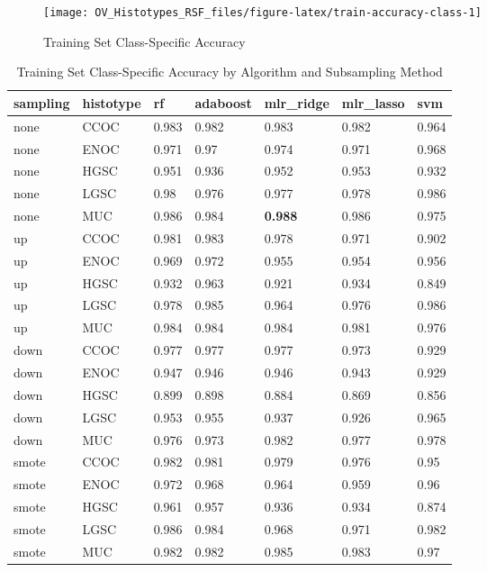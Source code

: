 \documentclass[
]{report}
\begin{document}
\begin{figure}[H]

{\centering \texttt{[image: OV\_Histotypes\_RSF\_files/figure-latex/train-accuracy-class-1]} 

}

\caption{Training Set Class-Specific Accuracy}\label{fig:train-accuracy-class}
\end{figure}

\begin{table}

\caption{\label{tab:train-accuracy-class-table}Training Set Class-Specific Accuracy by Algorithm and Subsampling Method}
\centering
\begin{tabular}[t]{l|l|l|l|l|l|l}
\hline
sampling & histotype & rf & adaboost & mlr\_ridge & mlr\_lasso & svm\\
\hline
none & CCOC & 0.983 & 0.982 & 0.983 & 0.982 & 0.964\\
\hline
none & ENOC & 0.971 & 0.97 & 0.974 & 0.971 & 0.968\\
\hline
none & HGSC & 0.951 & 0.936 & 0.952 & 0.953 & 0.932\\
\hline
none & LGSC & 0.98 & 0.976 & 0.977 & 0.978 & 0.986\\
\hline
none & MUC & 0.986 & 0.984 & \textbf{0.988} & 0.986 & 0.975\\
\hline
up & CCOC & 0.981 & 0.983 & 0.978 & 0.971 & 0.902\\
\hline
up & ENOC & 0.969 & 0.972 & 0.955 & 0.954 & 0.956\\
\hline
up & HGSC & 0.932 & 0.963 & 0.921 & 0.934 & 0.849\\
\hline
up & LGSC & 0.978 & 0.985 & 0.964 & 0.976 & 0.986\\
\hline
up & MUC & 0.984 & 0.984 & 0.984 & 0.981 & 0.976\\
\hline
down & CCOC & 0.977 & 0.977 & 0.977 & 0.973 & 0.929\\
\hline
down & ENOC & 0.947 & 0.946 & 0.946 & 0.943 & 0.929\\
\hline
down & HGSC & 0.899 & 0.898 & 0.884 & 0.869 & 0.856\\
\hline
down & LGSC & 0.953 & 0.955 & 0.937 & 0.926 & 0.965\\
\hline
down & MUC & 0.976 & 0.973 & 0.982 & 0.977 & 0.978\\
\hline
smote & CCOC & 0.982 & 0.981 & 0.979 & 0.976 & 0.95\\
\hline
smote & ENOC & 0.972 & 0.968 & 0.964 & 0.959 & 0.96\\
\hline
smote & HGSC & 0.961 & 0.957 & 0.936 & 0.934 & 0.874\\
\hline
smote & LGSC & 0.986 & 0.984 & 0.968 & 0.971 & 0.982\\
\hline
smote & MUC & 0.982 & 0.982 & 0.985 & 0.983 & 0.97\\
\hline
\end{tabular}
\end{table}
\end{document}
